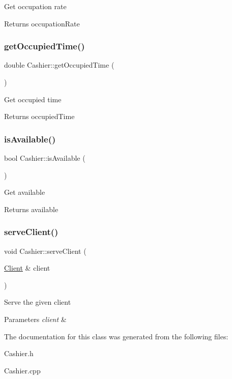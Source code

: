 Get occupation rate \begin{DoxyReturn}{Returns}
occupation\+Rate 
\end{DoxyReturn}
\mbox{\label{classCashier_a1123f41f1643d9cce2e502243b2aa5b3}} 
\subsubsection{\texorpdfstring{get\+Occupied\+Time()}{getOccupiedTime()}}
{\footnotesize\ttfamily double Cashier\+::get\+Occupied\+Time (\begin{DoxyParamCaption}{ }\end{DoxyParamCaption})}

Get occupied time \begin{DoxyReturn}{Returns}
occupied\+Time 
\end{DoxyReturn}
\mbox{\label{classCashier_a37d66e1a5f77c8f5cb8d77ef0b43e2e8}} 
\subsubsection{\texorpdfstring{is\+Available()}{isAvailable()}}
{\footnotesize\ttfamily bool Cashier\+::is\+Available (\begin{DoxyParamCaption}{ }\end{DoxyParamCaption})}

Get available \begin{DoxyReturn}{Returns}
available 
\end{DoxyReturn}
\mbox{\label{classCashier_a98be1361808932fb8a2fa4c294dcf09a}} 
\subsubsection{\texorpdfstring{serve\+Client()}{serveClient()}}
{\footnotesize\ttfamily void Cashier\+::serve\+Client (\begin{DoxyParamCaption}\item[{\hyperlink{classClient}{Client} \&}]{client }\end{DoxyParamCaption})}

Serve the given client 
\begin{DoxyParams}{Parameters}
{\em client} & \\
\hline
\end{DoxyParams}


The documentation for this class was generated from the following files\+:\begin{DoxyCompactItemize}
\item 
Cashier.\+h\item 
Cashier.\+cpp\end{DoxyCompactItemize}
